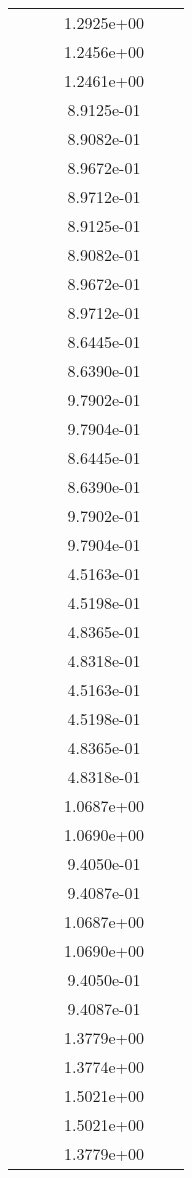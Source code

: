 \begin{xltabular}{\textwidth}{r|rS[table-format=1.3e+2]S[table-format=1.4e+2]S[table-format=1.4e+2]S[table-format=-1.5]}
&  &  & 1.2925e+00 & & \\
&  &  & 1.2456e+00 & & \\
&  &  & 1.2461e+00 & & \\
&  &  & 8.9125e-01 & & \\
&  &  & 8.9082e-01 & & \\
&  &  & 8.9672e-01 & & \\
&  &  & 8.9712e-01 & & \\
&  &  & 8.9125e-01 & & \\
&  &  & 8.9082e-01 & & \\
&  &  & 8.9672e-01 & & \\
&  &  & 8.9712e-01 & & \\
&  &  & 8.6445e-01 & & \\
&  &  & 8.6390e-01 & & \\
&  &  & 9.7902e-01 & & \\
&  &  & 9.7904e-01 & & \\
&  &  & 8.6445e-01 & & \\
&  &  & 8.6390e-01 & & \\
&  &  & 9.7902e-01 & & \\
&  &  & 9.7904e-01 & & \\
&  &  & 4.5163e-01 & & \\
&  &  & 4.5198e-01 & & \\
&  &  & 4.8365e-01 & & \\
&  &  & 4.8318e-01 & & \\
&  &  & 4.5163e-01 & & \\
&  &  & 4.5198e-01 & & \\
&  &  & 4.8365e-01 & & \\
&  &  & 4.8318e-01 & & \\
&  &  & 1.0687e+00 & & \\
&  &  & 1.0690e+00 & & \\
&  &  & 9.4050e-01 & & \\
&  &  & 9.4087e-01 & & \\
&  &  & 1.0687e+00 & & \\
&  &  & 1.0690e+00 & & \\
&  &  & 9.4050e-01 & & \\
&  &  & 9.4087e-01 & & \\
&  &  & 1.3779e+00 & & \\
&  &  & 1.3774e+00 & & \\
&  &  & 1.5021e+00 & & \\
&  &  & 1.5021e+00 & & \\
&  &  & 1.3779e+00 & & \\

\end{xltabular}
